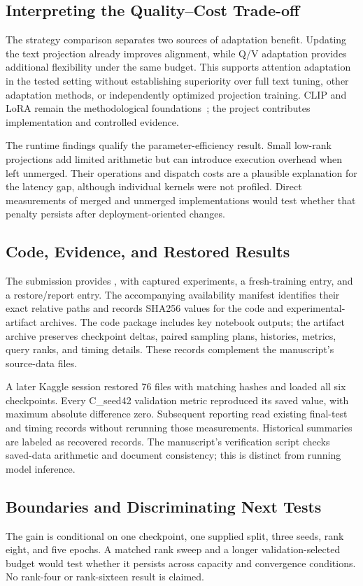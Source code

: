 \documentclass[conference]{IEEEtran}
\begin{document}
\subsection{Interpreting the Quality--Cost Trade-off}
The strategy comparison separates two sources of adaptation benefit. Updating the text projection already improves alignment, while Q/V adaptation provides additional flexibility under the same budget. This supports attention adaptation in the tested setting without establishing superiority over full text tuning, other adaptation methods, or independently optimized projection training. CLIP and LoRA remain the methodological foundations~\cite{radford2021clip,hu2022lora}; the project contributes implementation and controlled evidence.

The runtime findings qualify the parameter-efficiency result. Small low-rank projections add limited arithmetic but can introduce execution overhead when left unmerged. Their operations and dispatch costs are a plausible explanation for the latency gap, although individual kernels were not profiled. Direct measurements of merged and unmerged implementations would test whether that penalty persists after deployment-oriented changes.

\subsection{Code, Evidence, and Restored Results}
The submission provides , with captured experiments, a fresh-training entry, and a restore/report entry. The accompanying availability manifest identifies their exact relative paths and records SHA256 values for the code and experimental-artifact archives. The code package includes key notebook outputs; the artifact archive preserves checkpoint deltas, paired sampling plans, histories, metrics, query ranks, and timing details. These records complement the manuscript's source-data files.

A later Kaggle session restored 76 files with matching hashes and loaded all six checkpoints. Every C\_seed42 validation metric reproduced its saved value, with maximum absolute difference zero. Subsequent reporting read existing final-test and timing records without rerunning those measurements. Historical summaries are labeled as recovered records. The manuscript's verification script checks saved-data arithmetic and document consistency; this is distinct from running model inference.

\subsection{Boundaries and Discriminating Next Tests}
The gain is conditional on one checkpoint, one supplied split, three seeds, rank eight, and five epochs. A matched rank sweep and a longer validation-selected budget would test whether it persists across capacity and convergence conditions. No rank-four or rank-sixteen result is claimed.
\end{document}
